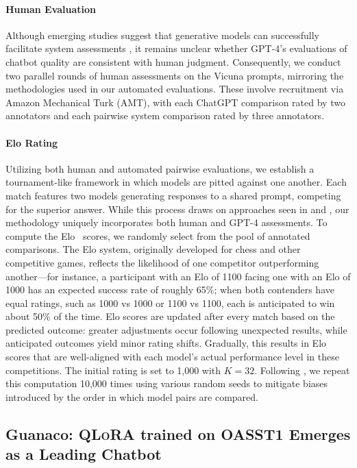 \paragraph{Human Evaluation} Although emerging studies suggest that generative models can successfully facilitate system assessments \citep{fu2023gptscore}, it remains unclear whether GPT-4’s evaluations of chatbot quality are consistent with human judgment. Consequently, we conduct two parallel rounds of human assessments on the Vicuna prompts, mirroring the methodologies used in our automated evaluations. These involve recruitment via Amazon Mechanical Turk (AMT), with each ChatGPT comparison rated by two annotators and each pairwise system comparison rated by three annotators.

\paragraph{Elo Rating} Utilizing both human and automated pairwise evaluations, we establish a tournament-like framework in which models are pitted against one another. Each match features two models generating responses to a shared prompt, competing for the superior answer. While this process draws on approaches seen in \citet{bai2022training} and \citet{vicuna2023}, our methodology uniquely incorporates both human and GPT-4 assessments. To compute the Elo~\citep{elo1967proposed,elo1978rating} scores, we randomly select from the pool of annotated comparisons. The Elo system, originally developed for chess and other competitive games, reflects the likelihood of one competitor outperforming another—for instance, a participant with an Elo of 1100 facing one with an Elo of 1000 has an expected success rate of roughly 65\%; when both contenders have equal ratings, such as 1000 vs 1000 or 1100 vs 1100, each is anticipated to win about 50\% of the time. Elo scores are updated after every match based on the predicted outcome: greater adjustments occur following unexpected results, while anticipated outcomes yield minor rating shifts. Gradually, this results in Elo scores that are well-aligned with each model’s actual performance level in these competitions. The initial rating is set to 1,000 with $K=32$. Following \citet{vicuna2023}, we repeat this computation 10,000 times using various random seeds to mitigate biases introduced by the order in which model pairs are compared.

\subsection{\textbf{Guanaco}: \textsc{QLoRA} trained on OASST1 Emerges as a Leading Chatbot}

